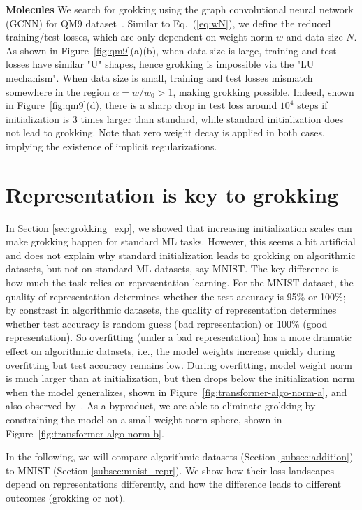 \documentclass{article} %
\begin{document}
{\bf Molecules} We search for grokking using the graph convolutional neural network (GCNN) for QM9 dataset~\citep{ramakrishnan2014quantum}. Similar to Eq.~(\ref{eq:wN}), we define the reduced training/test losses, which are only dependent on weight norm $w$ and data size $N$. As shown in Figure~\ref{fig:qm9}(a)(b), when data size is large, training and test losses have similar "U" shapes, hence grokking is impossible via the "LU mechanism". When data size is small, training and test losses mismatch somewhere in the region $\alpha=w/w_0>1$, making grokking possible. Indeed, shown in Figure~\ref{fig:qm9}(d), there is a sharp drop in test loss around $10^4$ steps if initialization is 3 times larger than standard, while standard initialization does not lead to grokking. Note that zero weight decay is applied in both cases, implying the existence of implicit regularizations.



\section{Representation is key to grokking}\label{sec:addition}


In Section \ref{sec:grokking_exp}, we showed that increasing initialization scales can make grokking happen for standard ML tasks. However, this seems a bit artificial and does not explain why standard initialization leads to grokking on algorithmic datasets, but not on standard ML datasets, say MNIST. The key difference is how much the task relies on representation learning. For the MNIST dataset, the quality of representation determines whether the test accuracy is 95\% or 100\%; by constrast in algorithmic datasets, the quality of representation determines whether test accuracy is random guess (bad representation) or 100\% (good representation). So overfitting (under a bad representation) has a more dramatic effect on algorithmic datasets, i.e., the model weights increase quickly during overfitting but test accuracy remains low. During overfitting, model weight norm is much larger than at initialization, but then drops below the initialization norm when the model generalizes, shown in Figure~\ref{fig:transformer-algo-norm-a}, and also observed by~\citep{neel2022}. As a byproduct, we are able to eliminate grokking by constraining the model on a small weight norm sphere, shown in Figure~\ref{fig:transformer-algo-norm-b}.



In the following, we will compare algorithmic datasets (Section \ref{subsec:addition}) to MNIST (Section \ref{subsec:mnist_repr}). We show how their loss landscapes depend on representations differently, and how the difference leads to different outcomes (grokking or not).
\end{document}
